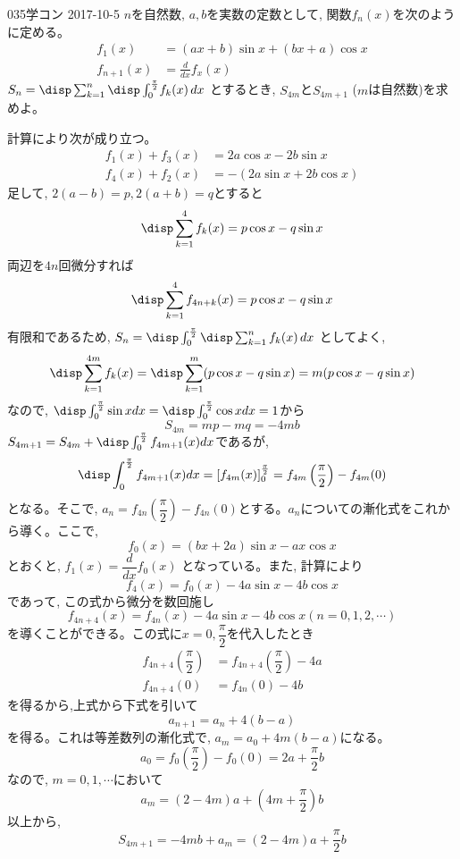 \begin{thm}{035}{}{学コン 2017-10-5}
 $n$を自然数, $a,b$を実数の定数として, 関数$f_n(x)$を次のように定める。
 \begin{align*}
  f_1(x)&=(ax+b)\sin{x}+(bx+a)\cos{x} \\
  f_{n+1}(x)&=\frac{d}{dx}f_x(x)
 \end{align*}
 $S_n=\disp\sum_{k=1}^n\disp\int_0^{\frac{\pi}{2}}\! f_k(x)\, dx$ とするとき, $S_{4m}$と$S_{4m+1}$ ($m$は自然数)を求めよ。
\end{thm}
計算により次が成り立つ。
\begin{align*}
 f_1(x)+f_3(x)&=2a\cos{x}-2b\sin{x} \\
 f_4(x)+f_2(x)&=-(2a\sin{x}+2b\cos{x}) 
\end{align*}
足して, $2(a-b)=p, 2(a+b)=q$とすると
\[\disp\sum_{k=1}^4f_k(x) = p\cos{x}-q\sin{x}\]
両辺を$4n$回微分すれば
\[\disp\sum_{k=1}^4f_{4n+k}(x) = p\cos{x}-q\sin{x}\]
有限和であるため, $S_n =\disp\int_0^{\frac{\pi}{2}} \disp\sum_{k=1}^nf_k(x)\, dx$ としてよく,
\[\disp\sum_{k=1}^{4m}f_k(x) = \disp\sum_{k=1}^{m}(p\cos{x}-q\sin{x})=m(p\cos{x}-q\sin{x})\]
なので, $\disp\int_0^{\frac{\pi}{2}}\sin{x}dx=\disp\int_0^{\frac{\pi}{2}}\cos{x}dx=1$から
\[S_{4m}=mp-mq=-4mb\]
$S_{4m+1}=S_{4m}+\disp\int_{0}^{\frac{\pi}{2}}f_{4m+1}(x)dx$であるが,
\[\disp\int_{0}^{\frac{\pi}{2}}f_{4m+1}(x)dx=\left[ f_{4m}(x)\right]^{\frac{\pi}{2}}_0 = f_{4m}\left(\dfrac{\pi}{2}\right)-f_{4m}(0)\]
となる。そこで, $a_n=f_{4n}\left( \dfrac{\pi}{2}\right)-f_{4n}(0)$とする。$a_n$についての漸化式をこれから導く。ここで, 
\[f_0(x)=(bx+2a)\sin{x}-ax\cos{x}\]
とおくと, $f_1(x)=\dfrac{d}{dx}f_0(x)$ となっている。また, 計算により
\[f_4(x)=f_0(x)-4a\sin{x}-4b\cos{x}\]
であって, この式から微分を数回施し
\[f_{4n+4}(x)=f_{4n}(x) -4a\sin{x}-4b\cos{x}　(n=0,1,2,\cdots )\]
を導くことができる。この式に$x=0,\dfrac{\pi}{2}$を代入したとき
\begin{align*}
 f_{4n+4}\left(\dfrac{\pi}{2}\right)&=f_{4n+4}\left( \dfrac{\pi}{2}\right)-4a \\
 f_{4n+4}(0)&=f_{4n}(0)-4b
\end{align*}
を得るから,上式から下式を引いて
\[a_{n+1}=a_n+4(b-a)\]
を得る。これは等差数列の漸化式で, $a_m=a_0+4m(b-a)$になる。
\[a_0=f_0\left(\dfrac{\pi}{2}\right)-f_0(0)=2a+\dfrac{\pi}{2}b\]
なので, $m=0,1,\cdots $において
\[a_m=(2-4m)a+\left(4m+\dfrac{\pi}{2}\right)b\]
以上から, 
\[S_{4m+1}=-4mb+a_m=(2-4m)a+\dfrac{\pi}{2}b\]
